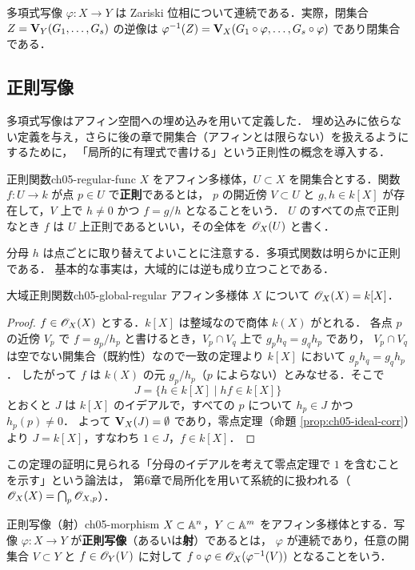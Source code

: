 多項式写像 $\varphi:X\to Y$ は Zariski 位相について連続である．実際，閉集合 $Z=\mathbf{V}_Y(G_1,\dots,G_s)$ の逆像は
$\varphi^{-1}(Z)=\mathbf{V}_X(G_1\circ\varphi,\dots,G_s\circ\varphi)$ であり閉集合である．

\subsection{正則写像}

多項式写像はアフィン空間への埋め込みを用いて定義した．
埋め込みに依らない定義を与え，さらに後の章で開集合（アフィンとは限らない）を扱えるようにするために，
「局所的に有理式で書ける」という正則性の概念を導入する．

\begin{mydef}{正則関数}{ch05-regular-func}
$X$ をアフィン多様体，$U\subset X$ を開集合とする．関数 $f:U\to k$ が点 $p\in U$ で\textbf{正則}であるとは，
$p$ の開近傍 $V\subset U$ と $g,h\in k[X]$ が存在して，$V$ 上で $h\neq 0$ かつ $f=g/h$ となることをいう．
$U$ のすべての点で正則なとき $f$ は $U$ 上正則であるといい，その全体を $\mathscr{O}_X(U)$ と書く．
\end{mydef}

分母 $h$ は点ごとに取り替えてよいことに注意する．多項式関数は明らかに正則である．
基本的な事実は，大域的には逆も成り立つことである．

\begin{mythm}{大域正則関数}{ch05-global-regular}
アフィン多様体 $X$ について $\mathscr{O}_X(X)=k[X]$．
\end{mythm}

\begin{proof}
$f\in\mathscr{O}_X(X)$ とする．$k[X]$ は整域なので商体 $k(X)$ がとれる．
各点 $p$ の近傍 $V_p$ で $f=g_p/h_p$ と書けるとき，$V_p\cap V_q$ 上で $g_ph_q=g_qh_p$ であり，
$V_p\cap V_q$ は空でない開集合（既約性）なので一致の定理より $k[X]$ において $g_ph_q=g_qh_p$．
したがって $f$ は $k(X)$ の元 $g_p/h_p$（$p$ によらない）とみなせる．そこで
\[
  J=\{h\in k[X]\mid hf\in k[X]\}
\]
とおくと $J$ は $k[X]$ のイデアルで，すべての $p$ について $h_p\in J$ かつ $h_p(p)\ne0$．
よって $\mathbf{V}_X(J)=\emptyset$ であり，零点定理（命題 \ref{prop:ch05-ideal-corr}）より $J=k[X]$，すなわち $1\in J$，$f\in k[X]$．
\end{proof}

この定理の証明に見られる「分母のイデアルを考えて零点定理で $1$ を含むことを示す」という論法は，
第6章で局所化を用いて系統的に扱われる（$\mathscr{O}_X(X)=\bigcap_{p}\mathscr{O}_{X,p}$）．

\begin{mydef}{正則写像（射）}{ch05-morphism}
$X\subset\mathbb{A}^n$，$Y\subset\mathbb{A}^m$ をアフィン多様体とする．写像 $\varphi:X\to Y$ が\textbf{正則写像}（あるいは\textbf{射}）であるとは，
$\varphi$ が連続であり，任意の開集合 $V\subset Y$ と $f\in\mathscr{O}_Y(V)$ に対して $f\circ\varphi\in\mathscr{O}_X(\varphi^{-1}(V))$ となることをいう．
\end{mydef}

